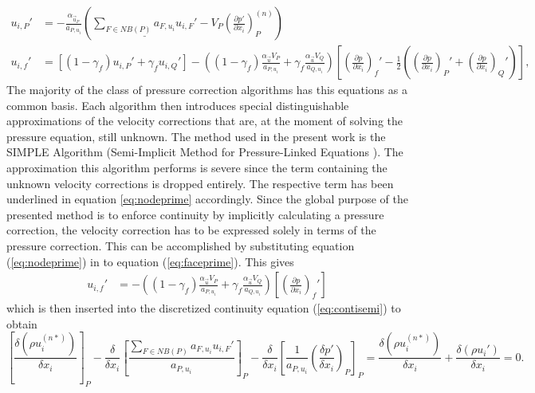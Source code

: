   \begin{align}
    \label{eq:nodeprime}
    u_{i,P}' 
    &=  
    - \frac{\alpha_{\vec{u}_P}}{a_{P,u_i}} \left(\underline{\sum_{F \in NB(P)} a_{F,u_i} u_{i,F}'}
    - V_P\left(\frac{\partial p'}{\partial x_i}\right)_P^{(n)} \right) \\[1em]
    \label{eq:faceprime}
    u_{i,f}' 
    &= 
    \left[\left(1 - \gamma_f\right) u_{i,P}' + \gamma_f u_{i,Q}' \right] 
    - 
    \left(\left(1 - \gamma_f\right) \frac{\alpha_\vec{u} V_P}{a_{P,u_i}} + \gamma_f \frac{\alpha_\vec{u} V_Q}{a_{Q,u_i}}\right)
    \left[ 
    \left(\frac{\partial p}{\partial x_i}\right)_f' 
    - \frac{1}{2} \left( \left( \frac{\partial p}{\partial x_i} \right)_P' 
    + \left(\frac{\partial p}{\partial x_i}\right)_Q' \right)
    \right],
  \end{align}
  The majority of the class of pressure correction algorithms has this equations as a common basis. Each algorithm then introduces special distinguishable approximations of the velocity corrections that are, at the moment of solving the pressure equation, still unknown. The method used in the present work is the SIMPLE Algorithm (Semi-Implicit Method for Pressure-Linked Equations \cite{spalding}). The approximation this algorithm performs is severe since the term containing the unknown velocity corrections is dropped entirely. The respective term has been underlined in equation \ref{eq:nodeprime} accordingly. Since the global purpose of the presented method is to enforce continuity by implicitly calculating a pressure correction, the velocity correction has to be expressed solely in terms of the pressure correction. This can be accomplished by substituting equation (\ref{eq:nodeprime}) in to equation (\ref{eq:faceprime}). This gives
  \begin{align}
    u_{i,f}' 
    &= 
    - 
    \left(\left(1 - \gamma_f\right) \frac{\alpha_\vec{u} V_P}{a_{P,u_i}} + \gamma_f \frac{\alpha_\vec{u} V_Q}{a_{Q,u_i}}\right)
    \left[ 
    \left(\frac{\partial p}{\partial x_i}\right)_f' 
    \right]  
  \end{align}
  which is then inserted into the discretized continuity equation (\ref{eq:contisemi}) to obtain
  \begin{equation}
    \left[\frac{\delta \left(\rho u_i^{(n*)}\right)}{\delta x_i} \right]_{P}
  - \frac{\delta}{\delta x_i} \left[ \frac{\sum_{F \in NB(P)} a_{F,u_i} u_{i,F}'}{a_{P,u_i}}\right]_{P}
  - \frac{\delta}{\delta x_i} \left[\frac{1}{a_{P,u_i}}\left(\frac{\delta p'}{\delta x_i}\right)_P\right]_{P}
  =
  \frac{\delta \left(\rho u_i^{(n*)}\right)}{\delta x_i} + \frac{\delta \left(\rho u_i'\right)}{\delta x_i}
  =
  0.
  \end{equation}
